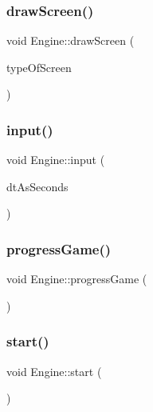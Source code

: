 \subsubsection{\texorpdfstring{draw\+Screen()}{drawScreen()}}
{\footnotesize\ttfamily void Engine\+::draw\+Screen (\begin{DoxyParamCaption}\item[{\hyperlink{_engine_8h_a9f5ff9109158e83287c5c888bf7bb8a7}{Screen\+Type}}]{type\+Of\+Screen }\end{DoxyParamCaption})\hspace{0.3cm}{\ttfamily [private]}}

\mbox{\label{class_engine_aa59920acbc4379a9672265904bc08b98}} 
\subsubsection{\texorpdfstring{input()}{input()}}
{\footnotesize\ttfamily void Engine\+::input (\begin{DoxyParamCaption}\item[{float \&}]{dt\+As\+Seconds }\end{DoxyParamCaption})\hspace{0.3cm}{\ttfamily [private]}}

\mbox{\label{class_engine_a54ab8f7be8ce000f7bd83a98d41d6b98}} 
\subsubsection{\texorpdfstring{progress\+Game()}{progressGame()}}
{\footnotesize\ttfamily void Engine\+::progress\+Game (\begin{DoxyParamCaption}{ }\end{DoxyParamCaption})\hspace{0.3cm}{\ttfamily [private]}}

\mbox{\label{class_engine_a4d8066dd213a03f5420d1bf60f150ca7}} 
\subsubsection{\texorpdfstring{start()}{start()}}
{\footnotesize\ttfamily void Engine\+::start (\begin{DoxyParamCaption}{ }\end{DoxyParamCaption})}



